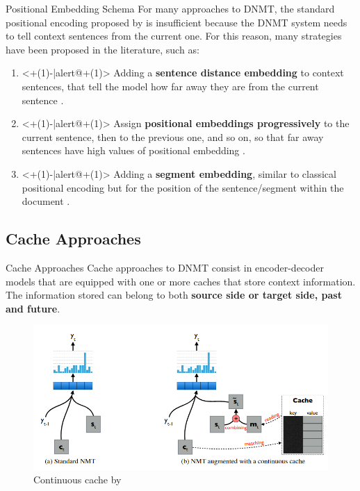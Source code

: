 \begin{frame}{Positional Embedding Schema}
	For many approaches to DNMT, the standard positional encoding proposed by \cite{vaswani_attention_2017} is insufficient because the DNMT system needs to tell context sentences from the current one. For this reason, many strategies have been proposed in the literature, such as:
	\begin{enumerate}
		\item<+(1)-|alert@+(1)> Adding a \textbf{sentence distance embedding} to context sentences, that tell the model how far away they are from the current sentence \cite{voita_when_2019}.
		\item<+(1)-|alert@+(1)> Assign \textbf{positional embeddings progressively} to the current sentence, then to the previous one, and so on, so that far away sentences have high values of positional embedding \cite{li_pretrained_2019}.
		\item<+(1)-|alert@+(1)> Adding a \textbf{segment embedding}, similar to classical positional encoding but for the position of the sentence/segment within the document  \cite{zheng_toward_2020}.
	\end{enumerate}
\end{frame}

\subsection{Cache Approaches}

\begin{frame}{Cache Approaches}
	Cache approaches to DNMT consist in encoder-decoder models that are equipped with one or more caches that store context information.
	The information stored can belong to both \textbf{source side or target side, past and future}. 

	\begin{figure}
		\centering
		\includegraphics[width=0.7\linewidth]{Images/cache}
		\caption{Continuous cache by \cite{tu_learning_2017}}
		\label{fig:cache}
	\end{figure} 
\end{frame}

